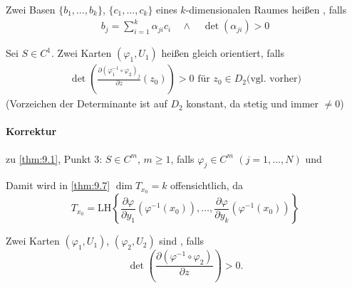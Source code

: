 \documentclass[a4paper,10pt]{scrbook}
\begin{document}
\begin{theorem} \label{thm:9.8}
  \begin{enum-arab}
    \item Zwei Basen $\{b_1,\ldots,b_k\}$, $\{c_1,\ldots,c_k\}$ eines $k$-dimensionalen Raumes heißen , falls
    \begin{align*}
      b_j = \sum\limits_{i=1}^{k} \alpha_{ji} c_i \quad\land\quad \det(\alpha_{ji}) > 0
    \end{align*}

    \item Sei $S \in C^1$. Zwei Karten $(\varphi_1,U_1)$ heißen gleich orientiert, falls
    \begin{align*}
      \det \left( \frac{\partial \left( \varphi_1^{-1} \circ \varphi_2 \right)_j}{\partial z}(z_0) \right) > 0 \text{ für } z_0 \in D_2 \text{(vgl. vorher)}
    \end{align*}
    (Vorzeichen der Determinante ist auf $D_2$ konstant, da stetig und immer $\neq 0$)
  \end{enum-arab}
\end{theorem}


\paragraph{Korrektur} zu \ref{thm:9.1}, Punkt 3: $S \in C^m$, $m \geq 1$, falls $\varphi_j \in C^m$ $(j = 1,\ldots,N)$ und

Damit wird in \ref{thm:9.7} $\dim T_{x_0} = k$ offensichtlich, da \[ T_{x_0} = \mathrm{LH}\left\{ \frac{\partial \varphi}{\partial y_1} \left( \varphi^{-1}(x_0) \right),\ldots,\frac{\partial \varphi}{\partial y_k} \left( \varphi^{-1}(x_0) \right) \right\} \]

\begin{notice*}[Ergänzung:]
  Zwei Karten $(\varphi_1,U_1)$, $(\varphi_2,U_2)$ sind  , falls \[ \det\left( \frac{\partial(\varphi^{-1} \circ \varphi_2)}{\partial z} \right) > 0. \]
\end{notice*}
\end{document}
